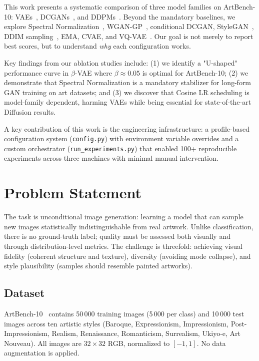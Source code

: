 \documentclass[runningheads]{llncs}
\begin{document}
This work presents a systematic comparison of three model families on ArtBench-10: VAEs~\cite{kingma2013}, DCGANs~\cite{radford2015}, and DDPMs~\cite{ho2020}. Beyond the mandatory baselines, we explore Spectral Normalization~\cite{miyato2018}, WGAN-GP~\cite{gulrajani2017}, conditional DCGAN, StyleGAN~\cite{karras2018}, DDIM sampling~\cite{song2020}, EMA, CVAE, and VQ-VAE~\cite{oord2017}. Our goal is not merely to report best scores, but to understand \emph{why} each configuration works.

Key findings from our ablation studies include: (1) we identify a "U-shaped" performance curve in $\beta$-VAE where $\beta \approx 0.05$ is optimal for ArtBench-10; (2) we demonstrate that Spectral Normalization is a mandatory stabilizer for long-form GAN training on art datasets; and (3) we discover that Cosine LR scheduling is model-family dependent, harming VAEs while being essential for state-of-the-art Diffusion results.

A key contribution of this work is the engineering infrastructure: a profile-based configuration system (\texttt{config.py}) with environment variable overrides and a custom orchestrator (\texttt{run\_experiments.py}) that enabled 100+ reproducible experiments across three machines with minimal manual intervention.

\section{Problem Statement}\label{sec:problem}

The task is unconditional image generation: learning a model that can sample new images statistically indistinguishable from real artwork. Unlike classification, there is no ground-truth label; quality must be assessed both visually and through distribution-level metrics. The challenge is threefold: achieving visual fidelity (coherent structure and texture), diversity (avoiding mode collapse), and style plausibility (samples should resemble painted artworks).

\subsection{Dataset}

ArtBench-10~\cite{liao2022} contains 50\,000 training images (5\,000 per class) and 10\,000 test images across ten artistic styles (Baroque, Expressionism, Impressionism, Post-Impressionism, Realism, Renaissance, Romanticism, Surrealism, Ukiyo-e, Art Nouveau). All images are $32 \times 32$ RGB, normalized to $[-1, 1]$. No data augmentation is applied.
\end{document}
